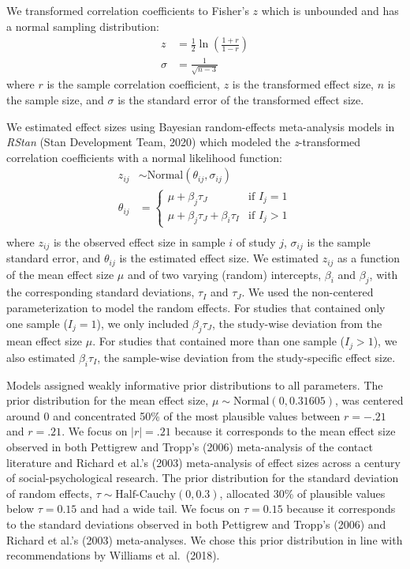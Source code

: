 \documentclass[twocolumn, 11pt, letterpaper]{article}
\begin{document}
We transformed correlation coefficients to Fisher's \(z\) which is
unbounded and has a normal sampling distribution: \begin{align*} 
z & = \frac{1}{2} \ln\left(\frac{1 + r}{1 - r}\right) \\ \sigma & = \frac{1}{\sqrt{n - 3}} \end{align*}
where \(r\) is the sample correlation coefficient, \(z\) is the
transformed effect size, \(n\) is the sample size, and \(\sigma\) is the
standard error of the transformed effect size.

We estimated effect sizes using Bayesian random-effects meta-analysis
models in \emph{RStan} (Stan Development Team, 2020) which modeled the
\emph{z}-transformed correlation coefficients with a normal likelihood
function:
\begin{align*} z_{ij} &\sim \text{Normal}(\theta_{ij}, \sigma_{ij}) \\ \theta_{ij} &= \begin{cases} \mu + \beta_j\tau_J & \text{if } I_j = 1 \\ \mu + \beta_j\tau_J + \beta_i\tau_I & \text{if } I_j > 1 \end{cases} \\ \end{align*}
where \(z_{ij}\) is the observed effect size in sample \(i\) of study
\(j\), \(\sigma_{ij}\) is the sample standard error, and \(\theta_{ij}\)
is the estimated effect size. We estimated \(z_{ij}\) as a function of
the mean effect size \(\mu\) and of two varying (random) intercepts,
\(\beta_i\) and \(\beta_j\), with the corresponding standard deviations,
\(\tau_I\) and \(\tau_J\). We used the non-centered parameterization to
model the random effects. For studies that contained only one sample
(\(I_j = 1\)), we only included \(\beta_j\tau_J\), the study-wise
deviation from the mean effect size \(\mu\). For studies that contained
more than one sample (\(I_j > 1\)), we also estimated \(\beta_i\tau_I\),
the sample-wise deviation from the study-specific effect size.

Models assigned weakly informative prior distributions to all
parameters. The prior distribution for the mean effect size,
\(\mu \sim \text{Normal}(0, 0.31605)\), was centered around 0 and
concentrated 50\% of the most plausible values between \(r = -.21\) and
\(r = .21\). We focus on \(|r| = .21\) because it corresponds to the
mean effect size observed in both Pettigrew and Tropp's (2006)
meta-analysis of the contact literature and Richard et al.'s (2003)
meta-analysis of effect sizes across a century of social-psychological
research. The prior distribution for the standard deviation of random
effects, \(\tau \sim \text{Half-Cauchy}(0, 0.3)\), allocated 30\% of
plausible values below \(\tau = 0.15\) and had a wide tail. We focus on
\(\tau = 0.15\) because it corresponds to the standard deviations
observed in both Pettigrew and Tropp's (2006) and Richard et al.'s
(2003) meta-analyses. We chose this prior distribution in line with
recommendations by Williams et al.~(2018).
\end{document}
